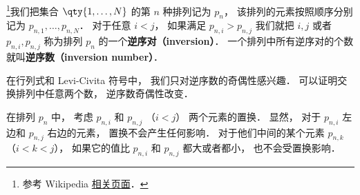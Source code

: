 
\begin{issues}
\issueDraft
\end{issues}


\footnote{参考 Wikipedia \href{https://en.wikipedia.org/wiki/Inversion_(discrete_mathematics)}{相关页面}．}我们把集合 $\qty{1,\dots,N}$ 的第 $n$ 种排列记为 $p_n$， 该排列的元素按照顺序分别记为 $p_{n,1}, \dots, p_{n,N}$． 对于任意 $i < j$， 如果满足 $p_{n,i} > p_{n,j}$ 我们就把 $i, j$ 或者 $p_{n,i}, p_{n,j}$ 称为排列 $p_n$ 的一个\textbf{逆序对（inversion）}． 一个排列中所有逆序对的个数就叫\textbf{逆序数（inversion number）}．

在行列式和 Levi-Civita 符号中， 我们只对逆序数的奇偶性感兴趣． 可以证明交换排列中任意两个数， 逆序数奇偶性改变． 

在排列 $p_n$ 中， 考虑 $p_{n,i}$ 和 $p_{n,j}$ （$i < j$） 两个元素的置换． 显然， 对于 $p_{n,i}$ 左边和 $p_{n,j}$ 右边的元素， 置换不会产生任何影响． 对于他们中间的某个元素 $p_{n, k}$ （$i < k < j$）， 如果它的值比 $p_{n,i}$ 和 $p_{n,j}$ 都大或者都小， 也不会受置换影响．
